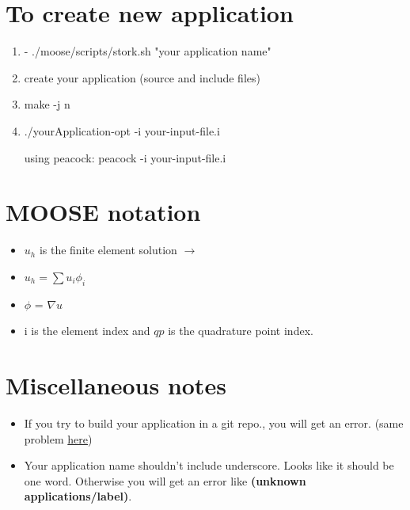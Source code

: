 \documentclass{article}
\begin{document}
\section{To create new application}
\begin{enumerate}
\item- ./moose/scripts/stork.sh "your application name" 
\item create your application (source and include files)
\item  make -j n
\item ./yourApplication-opt -i your-input-file.i

using peacock:
peacock -i your-input-file.i


\end{enumerate}
	\section{MOOSE notation}
	
	\begin{itemize}
	\item $u_h$ is the finite element solution $\to$ 
	\item $u_h = \sum u_i \phi_i $
	\item $\phi$ = $\nabla u$
	\item i is the element index and $qp$ is the quadrature point index.

	\end{itemize}
	
\section{Miscellaneous notes}
\begin{itemize}
	\item If you try to build your application in a git repo., you  will get an error.
	(same problem \href{https://groups.google.com/forum/#!searchin/moose-users/error$3A$20your$20current$20working$20directory$20is$20inside$20a$20git$20repository|sort:date/moose-users/7E68tlWsjU4/_obfaCeOBQAJ}{here})
	\item Your application name shouldn't include underscore. Looks like it should be one word. Otherwise you will get an error like \textbf{(unknown applications/label)}.
\end{itemize}
\end{document}
